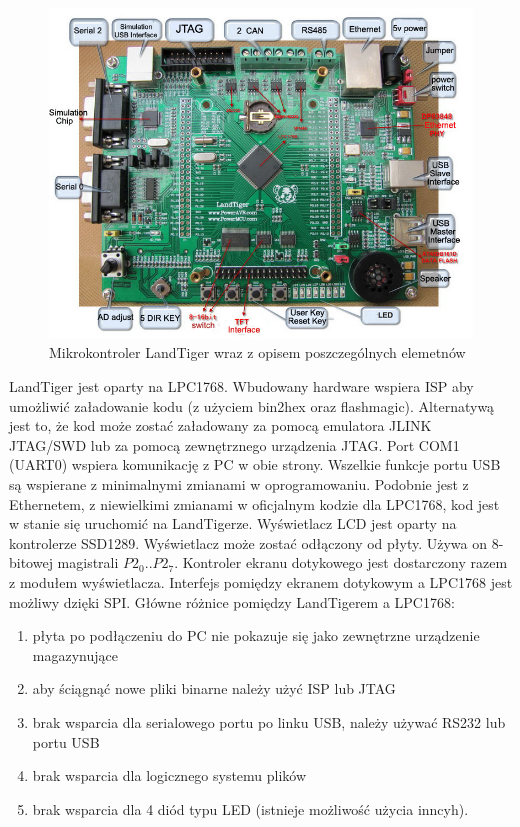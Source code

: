 \documentclass{BscUS}
\begin{document}
\begin{figure}[h]
\centering
\includegraphics{./img/landTiger3}
\caption{Mikrokontroler LandTiger wraz z opisem poszczególnych elemetnów \cite{landTiger3}}
\end{figure}
LandTiger jest oparty na LPC1768. Wbudowany hardware wspiera ISP aby umożliwić załadowanie kodu (z użyciem bin2hex oraz flashmagic).
Alternatywą jest to, że kod może zostać załadowany za pomocą emulatora JLINK JTAG/SWD lub za pomocą zewnętrznego urządzenia JTAG.
\newline
Port COM1 (UART0) wspiera komunikację z PC w obie strony. Wszelkie funkcje portu USB są wspierane z minimalnymi zmianami w oprogramowaniu. Podobnie jest z Ethernetem, z niewielkimi  zmianami w oficjalnym kodzie dla LPC1768, kod jest w stanie się uruchomić na LandTigerze.
\newline
\indent Wyświetlacz LCD jest oparty na kontrolerze SSD1289. Wyświetlacz może zostać odłączony od płyty. Używa on 8-bitowej magistrali \(P2_0..P2_7\). Kontroler ekranu dotykowego jest dostarczony razem z modułem wyświetlacza. Interfejs pomiędzy ekranem dotykowym a LPC1768 jest możliwy dzięki SPI.
\newline
Główne różnice pomiędzy LandTigerem a LPC1768:
\begin{enumerate} [label=(\alph*)]
\item płyta po podłączeniu do PC nie pokazuje się jako zewnętrzne urządzenie magazynujące
\item aby ściągnąć nowe pliki binarne należy użyć ISP lub JTAG
\item brak wsparcia dla serialowego portu po linku USB, należy używać RS232 lub portu USB
\item brak wsparcia dla logicznego systemu plików
\item brak wsparcia dla 4 diód typu LED (istnieje możliwość użycia inncyh).
\end{enumerate}
\end{document}
